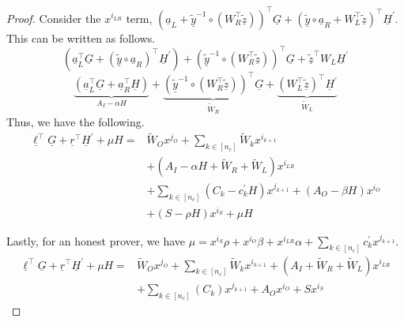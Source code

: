 \documentclass{article}
\theoremstyle{definition}
\newcommand{\zq}{\widetilde{\underline{z}}}
\newcommand{\yq}{\widetilde{\underline{y}}}
\begin{document}
\begin{proof}
Consider the $x^{i_{LR}}$ term, $\left(\underline{a}_L + \yq^{-1} \circ(W_R^\top\zq)\right)^\top \underline{G} + \left(\yq \circ \underline{a}_R + W_L^\top \zq\right)^\top \underline{H}^\prime$. This can be written as follows.
$$\left(\underline{a}^\top_L \underline{G} + \left(\yq \circ \underline{a}_R\right)^\top \underline{H}^\prime\right) + \left(\yq^{-1} \circ \left(W_R^\top \zq\right)\right)^\top \underline{G} + \zq^\top W_L \underline{H}^\prime$$
$$\underbrace{\left(\underline{a}^\top_L \underline{G} + \underline{a}_R^\top \underline{H}\right)}_{A_I - \alpha H} + \underbrace{\left(\yq^{-1} \circ \left( W_R^\top \zq\right)\right)^\top\underline{G}}_{\widetilde{W}_R} + \underbrace{(W_L^\top \zq)^\top \underline{H}^\prime}_{\widetilde{W}_L}$$
Thus, we have the following.
\begin{align*}
\underline{\ell}^\top \underline{G} + \underline{r}^\top \underline{H}^\prime + \mu H =& \widetilde{W}_O x^{j_O} + \sum_{k \in [n_c]} \widetilde{W}_k x^{i_{k+1}} \\
& + \left(A_I - \alpha H + \widetilde{W}_R + \widetilde{W}_L\right)x^{i_{LR}} \\
&+ \sum_{k \in [n_c]} \left(C_k - c_k^\prime H\right)x^{j_{k+1}} + (A_O - \beta H) x^{i_O} \\
&  + (S - \rho H) x^{i_S} + \mu H 
\end{align*}


Lastly, for an honest prover, we have $\mu = x^{i_S} \rho + x^{i_O} \beta + x^{i_{LR}} \alpha + \sum_{k \in [n_c]} c_k^\prime x^{j_{k+1}}$. 
\begin{align*}
\underline{\ell}^\top \underline{G} + \underline{r}^\top \underline{H}^\prime + \mu H =& \widetilde{W}_O x^{j_O} + \sum_{k \in [n_c]} \widetilde{W}_k x^{i_{k+1}}  + \left(A_I + \widetilde{W}_R + \widetilde{W}_L\right)x^{i_{LR}} \\
&+ \sum_{k \in [n_c]} \left(C_k\right)x^{j_{k+1}} + A_O x^{i_O}  + Sx^{i_S}
\end{align*}




\end{proof}
\end{document}
